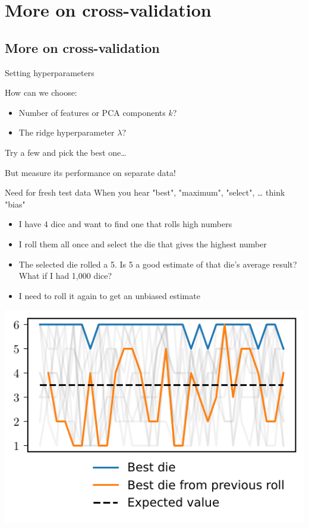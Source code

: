 \documentclass[presentation,mathserif,table]{beamer}
\begin{document}
\section{More on cross-validation}
\label{sec:org83f861b}
\subsection{More on cross-validation}
\label{sec:org9b9a5c5}

\begin{frame}[label={sec:org80d88ae}]{Setting hyperparameters}
\begin{block}{How can we choose:}
\begin{itemize}
\item Number of features or PCA components \(k\)?
\item The ridge hyperparameter \(\lambda\)?
\end{itemize}
\end{block}
Try a few and pick the best one\ldots{}

But measure its performance on separate data!
\end{frame}
\begin{frame}[label={sec:org66581c6}]{Need for fresh test data}
When you hear "best", "maximum", "select", \ldots{} think "bias"
\begin{itemize}
\item I have 4 dice and want to find one that rolls high numbers
\item I roll them all once and select the die that gives the highest number
\item The selected die rolled a 5. Is 5 a good estimate of that die's average result? What if I had 1,000 dice?
\item I need to roll it again to get an unbiased estimate
\end{itemize}
\begin{center}
\includegraphics[height=.5 \textheight]{figures/generated/regression_to_mean/dice_rolls.pdf}
\end{center}
\end{frame}
\end{document}
